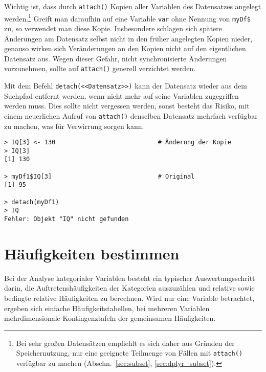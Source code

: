 Wichtig ist, dass durch \lstinline!attach()! Kopien aller Variablen des Datensatzes angelegt werden.\footnote{Bei sehr großen Datensätzen empfiehlt es sich daher aus Gründen der Speichernutzung, nur eine geeignete Teilmenge von Fällen mit \lstinline!attach()! verfügbar zu machen (Abschn.\ \ref{sec:subset}, \ref{sec:dplyr_subset}).} Greift man daraufhin auf eine Variable \lstinline!var! ohne Nennung von \lstinline!myDf$! zu, so verwendet man diese Kopie. Insbesondere schlagen sich spätere Änderungen am Datensatz selbst nicht in den früher angelegten Kopien nieder, genauso wirken sich Veränderungen an den Kopien nicht auf den eigentlichen Datensatz aus. Wegen dieser Gefahr, nicht synchronisierte Änderungen vorzunehmen, sollte auf \lstinline!attach()! generell verzichtet werden.

Mit dem Befehl \lstinline!detach(<<Datensatz>>)! kann der Datensatz wieder aus dem Suchpfad entfernt werden, wenn nicht mehr auf seine Variablen zugegriffen werden muss. Dies sollte nicht vergessen werden, sonst besteht das Risiko, mit einem neuerlichen Aufruf von \lstinline!attach()! denselben Datensatz mehrfach verfügbar zu machen, was für Verwirrung sorgen kann.
\begin{lstlisting}
> IQ[3] <- 130                            # Änderung der Kopie
> IQ[3]
[1] 130

> myDf1$IQ[3]                             # Original
[1] 95

> detach(myDf1)
> IQ
Fehler: Objekt "IQ" nicht gefunden
\end{lstlisting}

\section{Häufigkeiten bestimmen}
\label{sec:table}

Bei der Analyse kategorialer Variablen besteht ein typischer Auswertungsschritt darin, die Auftretenshäufigkeiten der Kategorien auszuzählen und relative sowie bedingte relative Häufigkeiten zu berechnen. Wird nur eine Variable betrachtet, ergeben sich einfache Häufigkeitstabellen, bei mehreren Variablen mehrdimensionale Kontingenztafeln der gemeinsamen Häufigkeiten.

